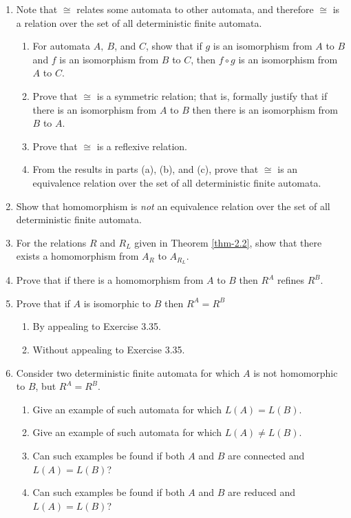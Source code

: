 \begin{enumerate}[{3.}1. ]
\item Note that $\cong$ relates some automata to other automata, and therefore
$\cong$ is a relation over the set of all deterministic finite automata.
\begin{enumerate}
\item For automata $A,\ B$, and $C$, show that if $g$ is an isomorphism from $A$
to $B$ and $f$ is an isomorphism from $B$ to $C$, then $f \circ g$ is an
isomorphism from $A$ to $C$.
\item Prove that $\cong$ is a symmetric relation; that is, formally justify that
if there is an isomorphism from $A$ to $B$ then there is an isomorphism from $B$
to $A$.
\item Prove that $\cong$ is a reflexive relation.
\item From the results in parts (a), (b), and (c), prove that $\cong$ is an
equivalence relation over the set of all deterministic finite automata.
\end{enumerate}

\item Show that homomorphism is \emph{not} an equivalence relation over the set of
all deterministic finite automata.

\item For the relations $R$ and $R_L$ given in Theorem \ref{thm-2.2}, show that there
exists a homomorphism from $A_R$ to $A_{R_L}$.

\item Prove that if there is a homomorphism from $A$ to $B$ then $R^A$ refines
$R^B$.

\item Prove that if $A$ is isomorphic to $B$ then $R^A=R^B$
\begin{enumerate}
\item By appealing to Exercise 3.35.
\item Without appealing to Exercise 3.35.
\end{enumerate}

\item Consider two deterministic finite automata for which $A$ is not
homomorphic to $B$, but $R^A=R^B$.
\begin{enumerate}
\item Give an example of such automata for which $L(A) = L(B)$.
\item Give an example of such automata for which $L(A) \not= L(B)$.
\item Can such examples be found if both $A$ and $B$ are connected and
$L(A)=L(B)$?
\item Can such examples be found if both $A$ and $B$ are reduced and
$L(A)=L(B)$?
\end{enumerate}


\end{enumerate}
